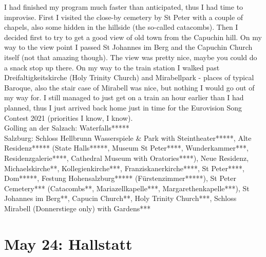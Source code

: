 I had finished my program much faster than anticipated, thus I had time to improvise. First I visited the close-by cemetery by St Peter with a couple of chapels, also some hidden in the hillside (the so-called catacombs). Then I decided first to try to get a good view of old town from the Capuchin hill. On my way to the view point I passed St Johannes im Berg and the Capuchin Church itself (not that amazing though). The view was pretty nice, maybe you could do a snack stop up there. On my way to the train station I walked past Dreifaltigkeitskirche (Holy Trinity Church) and Mirabellpark - places of typical Baroque, also the stair case of Mirabell was nice, but nothing I would go out of my way for. I still managed to just get on a train an hour earlier than I had planned, thus I just arrived back home just in time for the Eurovision Song Contest 2021 (priorities I know, I know).\\

Golling an der Salzach: Waterfalls*****\\
Salzburg: Schloss Hellbrunn Wasserspiele \& Park with Steintheater*****, Alte Residenz***** (State Halls*****, Museum St Peter****, Wunderkammer***, Residenzgalerie****, Cathedral Museum with Oratories****), Neue Residenz, Michaelskirche**, Kollegienkirche***, Franziskanerkirche****, St Peter****, Dom*****, Festung Hohensalzburg***** (F\"urstenzimmer*****), St Peter Cemetery*** (Catacombs**, Mariazellkapelle***, Margarethenkapelle***), St Johannes im Berg**, Capucin Church**, Holy Trinity Church***, Schloss Mirabell (Donnerstiege only) with Gardens***

\section{May 24: Hallstatt}
\label{May2021Hallstatt}


